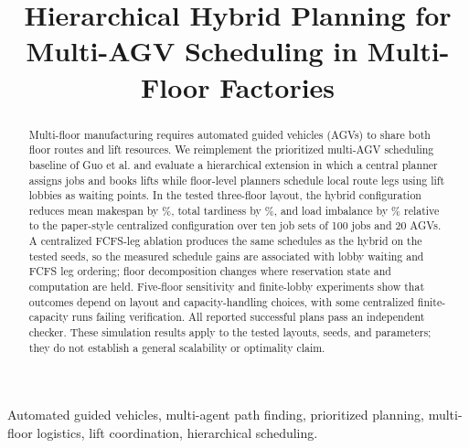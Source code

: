\documentclass[conference]{IEEEtran}
\title{Hierarchical Hybrid Planning for Multi-AGV Scheduling in Multi-Floor Factories}
\author{\IEEEauthorblockN{Author Name(s)}
\IEEEauthorblockA{Department or Organization\\
City, Country\\
email address}}
\begin{document}
\maketitle

\begin{abstract}
Multi-floor manufacturing requires automated guided vehicles (AGVs) to share
both floor routes and lift resources. We reimplement the prioritized
multi-AGV scheduling baseline of Guo et al. and evaluate a hierarchical
extension in which a central planner assigns jobs and books lifts while
floor-level planners schedule local route legs using lift lobbies as waiting
points. In the tested three-floor layout, the hybrid configuration reduces
mean makespan by \RedMakespanCAabs\%, total tardiness by
\RedTardinessCAabs\%, and load imbalance by \RedImbalanceCAabs\%
relative to the paper-style centralized configuration over ten job sets of
100 jobs and 20 AGVs. A centralized FCFS-leg ablation produces the same
schedules as the hybrid on the tested seeds, so the measured schedule gains
are associated with lobby waiting and FCFS leg ordering; floor decomposition
changes where reservation state and computation are held. Five-floor
sensitivity and finite-lobby experiments show that outcomes depend on layout
and capacity-handling choices, with some centralized finite-capacity runs
failing verification. All reported successful plans pass an independent
checker. These simulation results apply to the tested layouts, seeds, and
parameters; they do not establish a general scalability or optimality claim.
\end{abstract}

\begin{IEEEkeywords}
Automated guided vehicles, multi-agent path finding, prioritized planning,
multi-floor logistics, lift coordination, hierarchical scheduling.
\end{IEEEkeywords}











\appendices




\end{document}
